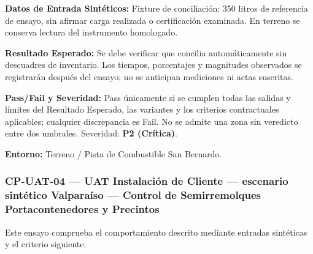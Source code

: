\par\noindent\textbf{Datos de Entrada Sintéticos:} Fixture de conciliación: 350 litros de referencia de ensayo, sin afirmar carga realizada o certificación examinada. En terreno se conserva lectura del instrumento homologado.\par
\par\noindent\textbf{Resultado Esperado:} Se debe verificar que concilia automáticamente sin descuadres de inventario. Los tiempos, porcentajes y magnitudes observados se registrarán después del ensayo; no se anticipan mediciones ni actas suscritas.\par
\par\noindent\textbf{Pass/Fail y Severidad:} Pass únicamente si se cumplen todas las salidas y límites del Resultado Esperado, las variantes y los criterios contractuales aplicables; cualquier discrepancia es Fail. No se admite una zona sin veredicto entre dos umbrales. Severidad: \textbf{P2 (Crítica)}.\par
\par\noindent\textbf{Entorno:} Terreno / Pista de Combustible San Bernardo.\par






\subsubsection*{CP-UAT-04 — UAT Instalación de Cliente — escenario sintético Valparaíso — Control de Semirremolques Portacontenedores y Precintos}\label{sec:9-cp-uat-04}
Este ensayo comprueba el comportamiento descrito mediante entradas sintéticas y el criterio siguiente.

